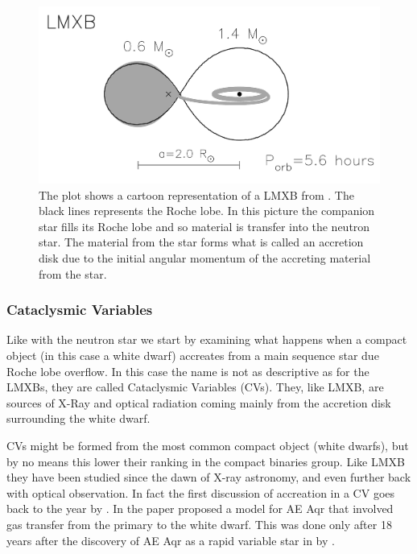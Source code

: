 \begin{figure}[]
        \centering
\includegraphics[scale=.3]{assets/images/lmxb1.png}
\caption{The plot shows a cartoon representation of a LMXB from \cite{lmxb1}. The black lines represents the Roche lobe. In this picture the companion star fills its Roche lobe and so material is transfer into the neutron star. The material from the star forms what is called an accretion disk due to the initial angular momentum of the accreting material from the star. }
\label{fig:lmxb1}
\end{figure}

\subsubsection{Cataclysmic Variables}

Like with the neutron star we start by examining what happens when a compact object (in this case a white dwarf) accreates from a main sequence star due Roche lobe overflow. In this case the name is not as descriptive as for the LMXBs, they are called Cataclysmic Variables (CVs). They, like LMXB, are sources of X-Ray and optical radiation coming mainly from the accretion disk surrounding the white dwarf. 

CVs might be formed from the most common compact object (white dwarfs), but by no means this lower their ranking in the compact binaries group. Like LMXB they have been studied since the dawn of X-ray astronomy, and even further back with optical observation. In fact the first discussion of accreation in a CV goes back to the year \citeyear{crawford_intrepretation_1956} by \citeauthor{crawford_intrepretation_1956}. In the paper \citeauthor{crawford_intrepretation_1956} proposed a model for AE Aqr that involved gas transfer from the primary to the white dwarf. This was done only after 18 years after the discovery of AE Aqr as a rapid variable star in \citeyear{zinner_mitteilungen_1938} by \citeauthor{zinner_mitteilungen_1938}.  


